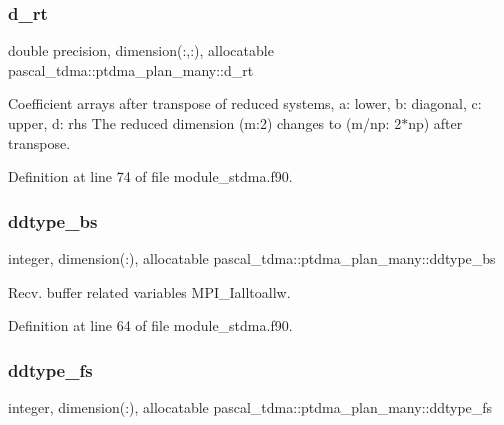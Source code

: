 \subsubsection{\texorpdfstring{d\_rt}{d\_rt}}
{\footnotesize\ttfamily double precision, dimension(\+:,\+:), allocatable pascal\+\_\+tdma\+::ptdma\+\_\+plan\+\_\+many\+::d\+\_\+rt}



Coefficient arrays after transpose of reduced systems, a\+: lower, b\+: diagonal, c\+: upper, d\+: rhs The reduced dimension (m\+:2) changes to (m/np\+: 2$\ast$np) after transpose. 



Definition at line 74 of file module\+\_\+stdma.\+f90.

\mbox{\label{structpascal__tdma_1_1ptdma__plan__many_a54ddb10078b443daf47204cdcd8e7f8f}} 
\subsubsection{\texorpdfstring{ddtype\_bs}{ddtype\_bs}}
{\footnotesize\ttfamily integer, dimension(\+:), allocatable pascal\+\_\+tdma\+::ptdma\+\_\+plan\+\_\+many\+::ddtype\+\_\+bs}



Recv. buffer related variables M\+P\+I\+\_\+\+Ialltoallw. 



Definition at line 64 of file module\+\_\+stdma.\+f90.

\mbox{\label{structpascal__tdma_1_1ptdma__plan__many_ad95f6ed58387dd66baecf53ed5fab7e8}} 
\subsubsection{\texorpdfstring{ddtype\_fs}{ddtype\_fs}}
{\footnotesize\ttfamily integer, dimension(\+:), allocatable pascal\+\_\+tdma\+::ptdma\+\_\+plan\+\_\+many\+::ddtype\+\_\+fs}



